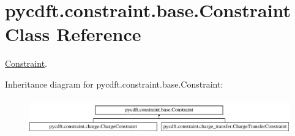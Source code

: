 \hypertarget{classpycdft_1_1constraint_1_1base_1_1Constraint}{\section{pycdft.\-constraint.\-base.\-Constraint Class Reference}
\label{classpycdft_1_1constraint_1_1base_1_1Constraint}
}


\hyperlink{classpycdft_1_1constraint_1_1base_1_1Constraint}{Constraint}.  


Inheritance diagram for pycdft.\-constraint.\-base.\-Constraint\-:\begin{figure}[H]
\begin{center}
\leavevmode
\includegraphics[height=1.555556cm]{classpycdft_1_1constraint_1_1base_1_1Constraint}
\end{center}
\end{figure}
